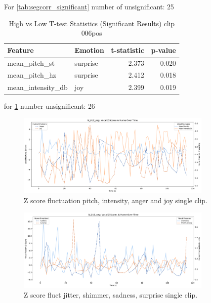 For \ref{tab:segcorr_significant} number of unsignificant: 25 



\begin{table}[H]
    \centering
    \begin{tabular}{llrr}
        \toprule
        \textbf{Feature}         & \textbf{Emotion} & \textbf{t-statistic} & \textbf{p-value} \\
        \midrule
        mean\_pitch\_st          & surprise         & 2.373                & 0.020            \\
        mean\_pitch\_hz          & surprise         & 2.412                & 0.018            \\
        mean\_intensity\_db      & joy              & 2.399                & 0.019            \\
        \bottomrule
    \end{tabular}
    \caption{High vs Low T-test Statistics (Significant Results) clip 006pos}
    \label{tab:seghighlow_ttest}
\end{table}
  
for \ref{tab:seghighlow_ttest} number unsignificant: 26 


\begin{figure}[H]
    \centering 
    \includegraphics[width=0.85\textwidth]{png/results/rq1_new/012_neg_use-anger-joy.pdf}
    \caption{Z score fluctuation pitch, intensity, anger and joy single clip.}
    \label{fig:z-score-ang-joy-012}
\end{figure}

\begin{figure}[H]
    \centering 
    \includegraphics[width=0.85\textwidth]{png/results/rq1_new/012_neg_use-sadn-surp.pdf}
    \caption{Z score fluct jitter, shimmer, sadness, surprise single clip.}
    \label{fig:z-score-surp-sadn-012}
\end{figure}


